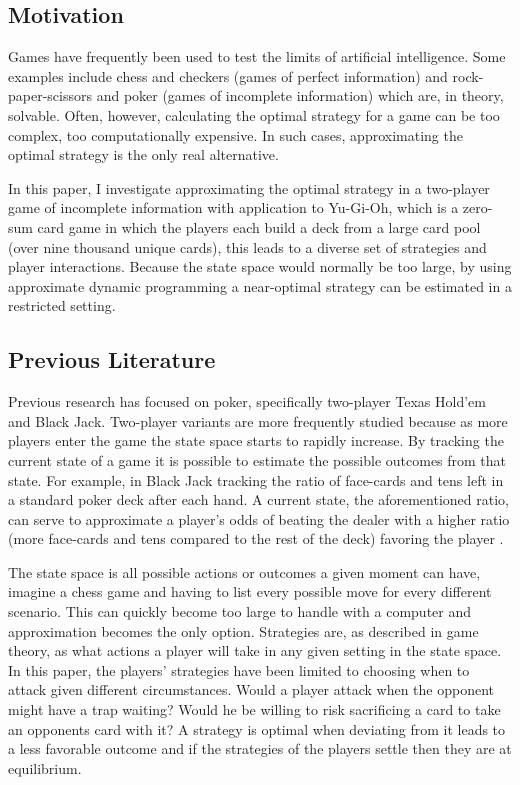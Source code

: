 
\subsection{Motivation}
Games have frequently been used to test the limits of artificial intelligence. Some examples include chess and checkers (games of perfect information) and rock-paper-scissors and poker (games of incomplete information) which are, in theory, solvable. Often, however, calculating the optimal strategy for a game can be too complex, too computationally expensive. In such cases, approximating the optimal strategy is the only real alternative.

In this paper, I investigate approximating the optimal strategy in a two-player game of incomplete information with application to Yu-Gi-Oh, which is a zero-sum card game in which the players each build a deck from a large card pool (over nine thousand unique cards), this leads to a diverse set of strategies and player interactions. Because the state space would normally be too large, by using approximate dynamic programming a near-optimal strategy can be estimated in a restricted setting.


\subsection{Previous Literature}
Previous research has focused on poker, specifically two-player Texas Hold'em and Black Jack. Two-player variants are more frequently studied because as more players enter the game the state space starts to rapidly increase. By tracking the current state of a game it is possible to estimate the possible outcomes from that state. For example, in Black Jack tracking the ratio of face-cards and tens left in a standard poker deck after each hand. A current state, the aforementioned ratio, can serve to approximate a player's odds of beating the dealer with a higher ratio (more face-cards and tens compared to the rest of the deck) favoring the player \citep{Thorp:2017}.

The state space is all possible actions or outcomes a given moment can have, imagine a chess game and having to list every possible move for every different scenario. This can quickly become too large to handle with a computer and approximation becomes the only option. Strategies are, as described in game theory, as what actions a player will take in any given setting in the state space. In this paper, the players' strategies have been limited to choosing when to attack given different circumstances. Would a player attack when the opponent might have a trap waiting? Would he be willing to risk sacrificing a card to take an opponents card with it? A strategy is optimal when deviating from it leads to a less favorable outcome and if the strategies of the players settle then they are at equilibrium.

